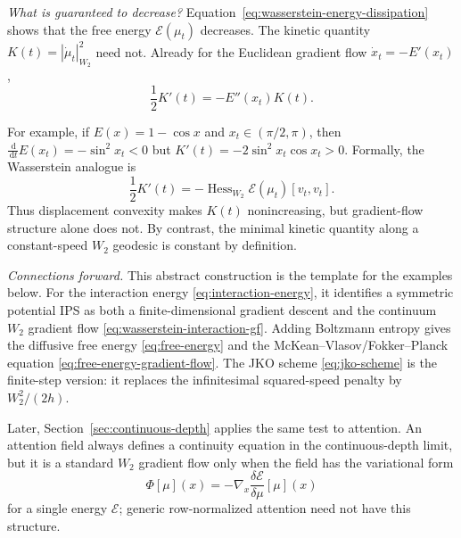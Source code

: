\documentclass[11pt]{amsart}
\numberwithin{equation}{section}
\theoremstyle{plain}
\newcommand{\dd}{\,\mathrm{d}}
\newcommand{\abs}[1]{\left\lvert#1\right\rvert}
\begin{document}
\begin{samepage}
\emph{What is guaranteed to decrease?}
Equation~\eqref{eq:wasserstein-energy-dissipation} shows that the free energy
$\mathcal E(\mu_t)$ decreases.  The kinetic quantity
$K(t)=\abs{\dot\mu_t}_{W_2}^2$ need not.  Already for the Euclidean gradient
flow $\dot x_t=-E'(x_t)$,
\[
 \frac12K'(t)=-E''(x_t)K(t).
\]
\end{samepage}
For example, if $E(x)=1-\cos x$ and $x_t\in(\pi/2,\pi)$, then
$\frac{\dd}{\dd t}E(x_t)=-\sin^2x_t<0$ but
$K'(t)=-2\sin^2x_t\cos x_t>0$.  Formally, the Wasserstein analogue is
\[
 \frac12K'(t)
 =-\operatorname{Hess}_{W_2}\mathcal E(\mu_t)[v_t,v_t].
\]
Thus displacement convexity makes $K(t)$ nonincreasing, but gradient-flow
structure alone does not.  By contrast, the minimal kinetic quantity along
a constant-speed $W_2$ geodesic is constant by definition.

\emph{Connections forward.}
This abstract construction is the template for the examples below.  For the
interaction energy \eqref{eq:interaction-energy}, it identifies a symmetric
potential IPS as both a finite-dimensional gradient descent and the
continuum $W_2$ gradient flow \eqref{eq:wasserstein-interaction-gf}.  Adding
Boltzmann entropy gives the diffusive free energy \eqref{eq:free-energy} and
the McKean--Vlasov/Fokker--Planck equation
\eqref{eq:free-energy-gradient-flow}.  The JKO scheme
\eqref{eq:jko-scheme} is the finite-step version: it replaces the
infinitesimal squared-speed penalty by $W_2^2/(2h)$.

Later, Section~\ref{sec:continuous-depth} applies the same test to attention.
An attention field always defines a continuity equation in the
continuous-depth limit, but it is a standard $W_2$ gradient flow only when
the field has the variational form
\[
 \Phi[\mu](x)
 =-\nabla_x\frac{\delta\mathcal E}{\delta\mu}[\mu](x)
\]
for a single energy $\mathcal E$; generic row-normalized attention need not
have this structure.
\end{document}
